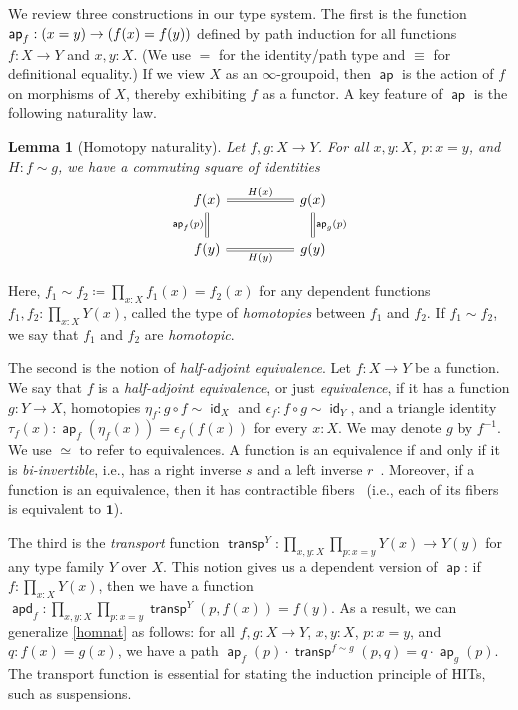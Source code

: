 \documentclass[10pt,a4paper]{article}
\newtheorem{lem}[thm]{Lemma}
\theoremstyle{definition}
\theoremstyle{remark}
\newcommand{\0}{\mathbf{0}}
\newcommand{\1}{\mathbf{1}}
\newcommand{\2}{\mathbf{2}}
\DeclareMathOperator{\transport}{\mathsf{transp}}
\DeclareMathOperator{\ap}{\mathsf{ap}}
\DeclareMathOperator{\apd}{\mathsf{apd}}
\DeclareMathOperator{\idd}{\mathsf{id}}
\begin{document}
We review three constructions in our type system. The first is the function $\ap_f : \mleft(x = y\mright) \to \mleft(f(x) = f(y)\mright)$ defined by path induction for all functions $f : X \to Y$ and $x, y : X$. (We use $=$ for the identity/path type and $\equiv$ for definitional equality.) If we view $X$ as an $\infty$-groupoid, then $\ap$ is the action of $f$ on morphisms of $X$, thereby exhibiting $f$ as a functor. A key feature of $\ap$ is the following naturality law.
\begin{lem}[Homotopy naturality] \label{homnat}
Let $f, g : X \to Y$. For all $x, y : X$, $p : x = y$, and $H : f \sim g$, we have a commuting square of identities
\[\begin{tikzcd}
	{f(x)} && {g(x)} \\
	{f(y)} && {g(y)}
	\arrow["{H(x)}", Rightarrow, no head, from=1-1, to=1-3]
	\arrow["{\ap_f(p)}"', Rightarrow, no head, from=1-1, to=2-1]
	\arrow["{\ap_g(p)}", Rightarrow, no head, from=1-3, to=2-3]
	\arrow["{H(y)}"', Rightarrow, no head, from=2-1, to=2-3]
\end{tikzcd}\] 
\end{lem}
Here, $f_1 \sim f_2 \coloneqq \prod_{x : X} f_1(x) = f_2(x)$ for any dependent functions $f_1, f_2 : \prod_{x: X}Y(x)$, called the type of \emph{homotopies} between $f_1$ and $f_2$. If $f_1 \sim f_2$, we say that $f_1$ and $f_2$ are \emph{homotopic}.

The second is the notion of \emph{half-adjoint equivalence}. Let $f : X \to Y$ be a function. We say that $f$ is a \emph{half-adjoint equivalence}, or just \emph{equivalence}, if it has a function $g : Y \to X$, homotopies $\eta_f : g \circ f \sim \idd_X$ and $\epsilon_f : f \circ g \sim \idd_Y$, and a triangle identity $\tau_f(x) : \ap_f(\eta_f(x)) = \epsilon_f(f(x))$ for every $x : X$. We may denote $g$ by $f^{-1}$. We use $\simeq$ to refer to equivalences. A function is an equivalence if and only if it is \emph{bi-invertible}, i.e., has a right inverse $s$ and a left inverse $r$~\cite[Corollary 4.3.3]{Uni13}. Moreover, if  a function is an equivalence, then it has contractible fibers~\cite[Section 4.4]{Uni13} (i.e., each of its fibers is equivalent to $\1$).

The third is the \emph{transport} function $\transport^Y : \prod_{x, y : X}\prod_{p : x = y}Y(x) \to Y(y)$ for any type family $Y$ over $X$.  This notion gives us a dependent version of $\ap$: if $f : \prod_{x : X}Y(x)$, then we have a function $\apd_f : \prod_{x, y : X}\prod_{p : x = y} \transport^Y(p, f(x)) = f(y)$. As a result, we can generalize \autoref{homnat} as follows: for all $f, g : X \to Y$, $x, y : X$, $p : x = y$, and $q : f(x) = g(x)$, we have a path $\ap_f(p) \cdot \transport^{f \sim g}(p,q) = q \cdot \ap_g(p)$. The transport function is essential for stating the induction principle of HITs, such as suspensions.
\end{document}
